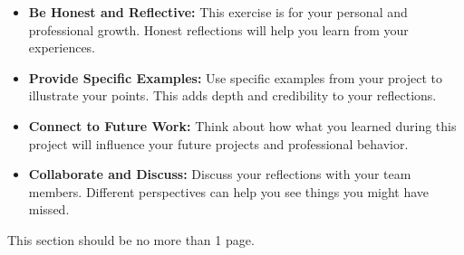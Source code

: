 \documentclass[]{article}
\begin{document}
\begin{itemize}
\item
  \textbf{Be Honest and Reflective:} This exercise is for your personal
  and professional growth. Honest reflections will help you learn from
  your experiences.
\item
  \textbf{Provide Specific Examples:} Use specific examples from your
  project to illustrate your points. This adds depth and credibility to
  your reflections.
\item
  \textbf{Connect to Future Work:} Think about how what you learned
  during this project will influence your future projects and
  professional behavior.
\item
  \textbf{Collaborate and Discuss:} Discuss your reflections with your
  team members. Different perspectives can help you see things you might
  have missed.
\end{itemize}

This section should be no more than 1 page.
\end{document}
